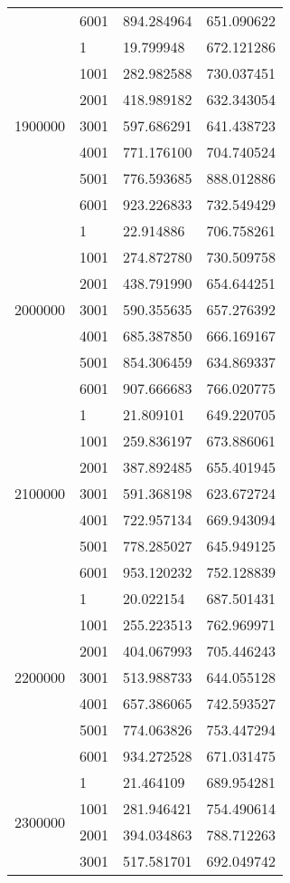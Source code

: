 \begin{table}[htb!]
\begin{tabular}{llll}
 & 6001 & 894.284964 & 651.090622 \\
\multirow[c]{7}{*}{1900000} & 1 & 19.799948 & 672.121286 \\
 & 1001 & 282.982588 & 730.037451 \\
 & 2001 & 418.989182 & 632.343054 \\
 & 3001 & 597.686291 & 641.438723 \\
 & 4001 & 771.176100 & 704.740524 \\
 & 5001 & 776.593685 & 888.012886 \\
 & 6001 & 923.226833 & 732.549429 \\
\multirow[c]{7}{*}{2000000} & 1 & 22.914886 & 706.758261 \\
 & 1001 & 274.872780 & 730.509758 \\
 & 2001 & 438.791990 & 654.644251 \\
 & 3001 & 590.355635 & 657.276392 \\
 & 4001 & 685.387850 & 666.169167 \\
 & 5001 & 854.306459 & 634.869337 \\
 & 6001 & 907.666683 & 766.020775 \\
\multirow[c]{7}{*}{2100000} & 1 & 21.809101 & 649.220705 \\
 & 1001 & 259.836197 & 673.886061 \\
 & 2001 & 387.892485 & 655.401945 \\
 & 3001 & 591.368198 & 623.672724 \\
 & 4001 & 722.957134 & 669.943094 \\
 & 5001 & 778.285027 & 645.949125 \\
 & 6001 & 953.120232 & 752.128839 \\
\multirow[c]{7}{*}{2200000} & 1 & 20.022154 & 687.501431 \\
 & 1001 & 255.223513 & 762.969971 \\
 & 2001 & 404.067993 & 705.446243 \\
 & 3001 & 513.988733 & 644.055128 \\
 & 4001 & 657.386065 & 742.593527 \\
 & 5001 & 774.063826 & 753.447294 \\
 & 6001 & 934.272528 & 671.031475 \\
\multirow[c]{7}{*}{2300000} & 1 & 21.464109 & 689.954281 \\
 & 1001 & 281.946421 & 754.490614 \\
 & 2001 & 394.034863 & 788.712263 \\
 & 3001 & 517.581701 & 692.049742 \\

\end{tabular}
\end{table}
